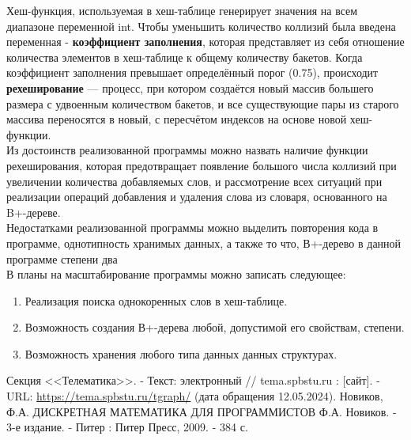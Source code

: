 \documentclass[10pt,a4paper,final]{article} %
\begin{document}
Хеш-функция, используемая в хеш-таблице генерирует значения на всем диапазоне переменной int. Чтобы уменьшить количество коллизий была введена переменная - \textbf{коэффициент заполнения}, которая представляет из себя отношение количества элементов в хеш-таблице к общему количеству бакетов. Когда коэффициент заполнения превышает определённый порог (0.75), происходит \textbf{рехеширование} — процесс, при котором создаётся новый массив большего размера с удвоенным количеством бакетов, и все существующие пары из старого массива переносятся в новый, с пересчётом индексов на основе новой хеш-функции. \\

Из достоинств реализованной программы можно назвать наличие функции рехеширования, которая предотвращает появление большого числа коллизий при увеличении количества добавляемых слов, и рассмотрение всех ситуаций при реализации операций добавления и удаления слова из словаря, основанного на B+-дереве.\\

Недостатками реализованной программы можно выделить повторения кода в программе, однотипность хранимых данных, а также то что, В+-дерево в данной программе степени два  \\

В планы на масштабирование программы можно записать следующее:
\begin{enumerate}[label*=\textbullet]
	\item Реализация поиска однокоренных слов в хеш-таблице.
	\item Возможность создания В+-дерева любой, допустимой его свойствам, степени.
	\item Возможность хранения любого типа данных данных структурах.
\end{enumerate}

\newpage
{}
\begin{thebibliography}{0}
	 Секция <<Телематика>>. - Текст: электронный // tema.spbstu.ru : [сайт]. - URL: \href{https://tema.spbstu.ru/tgraph/}{https://tema.spbstu.ru/tgraph/} (дата обращения 12.05.2024).
	  Новиков, Ф.А. ДИСКРЕТНАЯ МАТЕМАТИКА ДЛЯ ПРОГРАММИСТОВ Ф.А. Новиков. - 3-е издание. - Питер : Питер Пресс, 2009. - 384 с.
\end{thebibliography}
\end{document}
